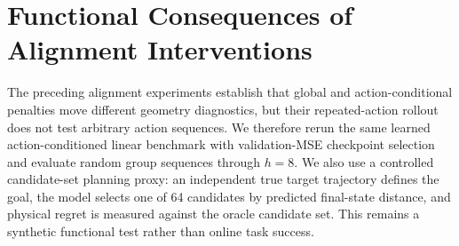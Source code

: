 \documentclass{article}
\begin{document}
\section{Functional Consequences of Alignment Interventions}
\label{sec:supp-alignment-functional}

The preceding alignment experiments establish that global and action-conditional
penalties move different geometry diagnostics, but their repeated-action rollout
does not test arbitrary action sequences. We therefore rerun the same learned
action-conditioned linear benchmark with validation-MSE checkpoint selection and
evaluate random group sequences through $h=8$. We also use a controlled
candidate-set planning proxy: an independent true target trajectory defines the
goal, the model selects one of 64 candidates by predicted final-state distance,
and physical regret is measured against the oracle candidate set. This remains a
synthetic functional test rather than online task success.
\end{document}
